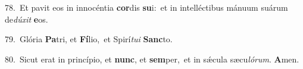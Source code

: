 {\numbfont\textcolor{\numbcolor}{78.}}~Et pavit eos in innocéntia \textbf{cor}\-dis \textbf{su}\-i:~\star et in intelléctibus mánuum suárum de\-\textit{dú}\-\textit{xit} \textbf{e}\-os.\par
{\numbfont\textcolor{\numbcolor}{79.}}~Glória \textbf{Pa}\-tri, et \textbf{Fí}\-lio,~\star et Spirí\-\textit{tu}\-\textit{i} \textbf{Sanc}\-to.\par
{\numbfont\textcolor{\numbcolor}{80.}}~Sicut erat in princípio, et \textbf{nunc}\-, et \textbf{sem}\-per,~\star et in sǽcula sæcu\-\textit{ló}\-\textit{rum}. \textbf{A}\-men.\par
